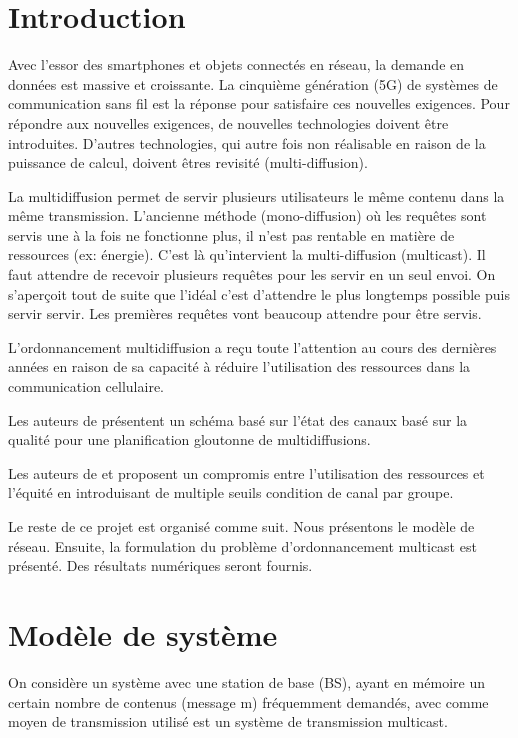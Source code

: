 \documentclass[runningheads]{llncs}
\begin{document}
\section{Introduction}
Avec l’essor des smartphones et objets connectés en réseau, la demande en données 
est massive et croissante. La cinquième génération (5G) de systèmes de 
communication sans fil est la réponse pour satisfaire ces nouvelles exigences.
Pour répondre aux nouvelles exigences, de nouvelles technologies doivent 
être introduites. D’autres technologies, qui autre fois non réalisable en 
raison de la puissance de calcul, doivent êtres revisité (multi-diffusion).

La multidiffusion permet de servir  plusieurs utilisateurs  le même contenu dans 
la même transmission. L'ancienne méthode (mono-diffusion) où les requêtes sont servis 
une à la fois ne fonctionne plus, il n'est pas rentable en matière de 
ressources (ex: énergie). C'est là qu'intervient la multi-diffusion (multicast).
Il faut attendre de recevoir  plusieurs requêtes pour les servir en un seul
envoi. On s'aperçoit tout de suite que l'idéal c'est d'attendre le plus longtemps
possible puis servir servir. Les premières requêtes vont beaucoup attendre pour 
être servis.

L'ordonnancement multidiffusion a reçu toute l'attention au cours des 
dernières années en raison de sa capacité à réduire l'utilisation 
des ressources dans la communication cellulaire.

Les auteurs de \cite{inho2015} présentent un schéma bas\'e sur l'état 
des canaux basé sur la qualité pour une planification gloutonne de multidiffusions.

Les auteurs de \cite{inho2017} et \cite{hang2017} proposent un 
compromis entre l'utilisation des ressources et l'équité en introduisant 
de multiple  seuils condition de canal par groupe.


Le reste de ce projet est organis\'e comme suit. Nous présentons le modèle de réseau.
Ensuite, la formulation du problème d'ordonnancement multicast est pr\'esent\'e.
Des r\'esultats numériques seront fournis.


\section{Modèle de système}
On considère un système avec une station de base (BS), ayant en mémoire 
un certain nombre de contenus (message m) fréquemment demandés, avec comme 
moyen de transmission utilisé est un système de transmission multicast.
\end{document}
